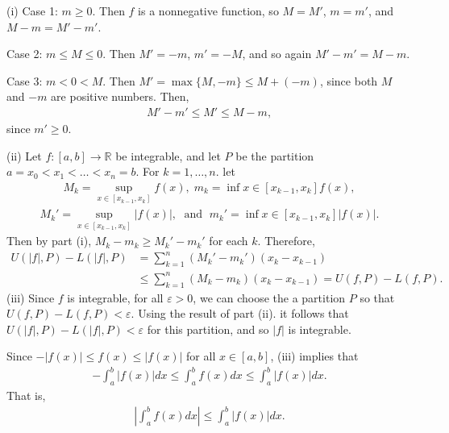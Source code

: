 \documentclass[letterpaper,10pt,english]{jupyterBook}
\begin{document}
\sphinxAtStartPar
(i) Case 1: \(m\geq 0\). Then \(f\) is a non\sphinxhyphen{}negative function, so \(M=M'\), \(m=m'\), and \(M-m=M'-m'\).

\sphinxAtStartPar
Case 2: \(m\leq M\leq 0\). Then \(M'=-m\), \(m'=-M\), and so again \(M'-m'=M-m\).

\sphinxAtStartPar
Case 3: \(m<0<M\). Then \(M'=\max\{M,-m\}\leq M+(-m)\), since both \(M\) and \(-m\) are positive numbers. Then,
\begin{equation*}
\begin{split}
M'-m' \leq M' \leq M-m,
\end{split}
\end{equation*}
\sphinxAtStartPar
since \(m'\geq 0\).

\sphinxAtStartPar
(ii) Let \(f:[a,b]\to\mathbb{R}\) be integrable, and let \(P\) be the partition \(a=x_0<x_1<\ldots<x_n=b\). For \(k=1,\ldots,n\). let
\begin{equation*}
\begin{split}
M_k=\sup_{x\in[x_{k-1},x_k]}f(x), \; m_k=\inf{x\in[x_{k-1},x_k]}f(x),
\end{split}
\end{equation*}\begin{equation*}
\begin{split}
M_k'=\sup_{x\in[x_{k-1},x_k]}|f(x)|, \; \text{ and } \; m_k'=\inf{x\in[x_{k-1},x_k]}|f(x)|.
\end{split}
\end{equation*}
\sphinxAtStartPar
Then by part (i), \(M_k-m_k\geq M_k'-m_k'\) for each \(k\). Therefore,
\begin{align*}
U(|f|,P) - L(|f|,P) &= \sum_{k=1}^n(M_k'-m_k')(x_k-x_{k-1}) \\
&\leq \sum_{k=1}^n(M_k-m_k)(x_k-x_{k-1}) = U(f,P)-L(f,P).
\end{align*}
\sphinxAtStartPar
(iii) Since \(f\) is integrable, for all \(\varepsilon>0\), we can choose the a partition \(P\) so that \(U(f,P)-L(f,P)<\varepsilon\). Using the result of part (ii). it follows that \(U(|f|,P)-L(|f|,P)<\varepsilon\) for this partition, and so \(|f|\) is integrable.

\sphinxAtStartPar
Since \(-|f(x)|\leq f(x)\leq |f(x)|\) for all \(x\in[a,b]\), (iii) implies that
\begin{equation*}
\begin{split}
-\int_a^b|f(x)|dx \leq \int_a^b f(x)dx \leq \int_a^b|f(x)|dx.
\end{split}
\end{equation*}
\sphinxAtStartPar
That is,
\begin{equation*}
\begin{split}
\left|\int_a^b f(x)dx\right| \leq \int_a^b|f(x)|dx.
\end{split}
\end{equation*}
\end{document}
